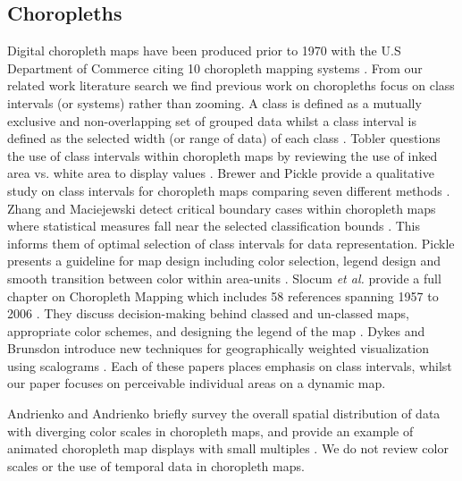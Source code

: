\subsection{Choropleths}
Digital choropleth maps have been produced prior to  1970 with the U.S Department of Commerce citing 10 choropleth mapping systems \cite{us1970use}. From our related work literature search we find previous work on choropleths focus on class intervals (or systems) rather than zooming. A class is defined as a mutually exclusive and non-overlapping set of grouped data whilst a class interval is defined as the selected width (or range of data) of each class \cite{hooda1994statistics}. Tobler questions the use of class intervals within choropleth maps by reviewing the use of inked area vs. white area to display values \cite{tobler1973choropleth}. Brewer and Pickle provide a qualitative study on class intervals for choropleth maps comparing seven different methods \cite{brewer2002evaluation}. Zhang and Maciejewski detect critical boundary cases within choropleth maps where statistical measures fall near the selected classification bounds \cite{zhang2017quantifying}. This informs them of optimal selection of class intervals for data representation. Pickle presents a guideline for map design including color selection, legend design and smooth transition between color within area-units \cite{pickle2003usability}. Slocum \textit{et al.} provide a full chapter on Choropleth Mapping which includes 58 references \cite{slocum2009thematic} spanning 1957 \cite{stevens1957ratio} to 2006 \cite{anselin2006geoda}. They discuss decision-making behind classed and un-classed maps, appropriate color schemes, and designing the legend of the map \cite{slocum2009thematic}. Dykes and Brunsdon introduce new techniques for geographically weighted visualization using scalograms \cite{dykes2007geographically}. Each of these papers places emphasis on class intervals, whilst our paper focuses on perceivable individual areas on a dynamic map.

Andrienko and Andrienko briefly survey the overall spatial distribution of data with diverging color scales in choropleth maps, and provide an example of animated choropleth map displays with small multiples \cite{andrienko2006exploratory}. We do not review color scales or the use of temporal data in choropleth maps. 

